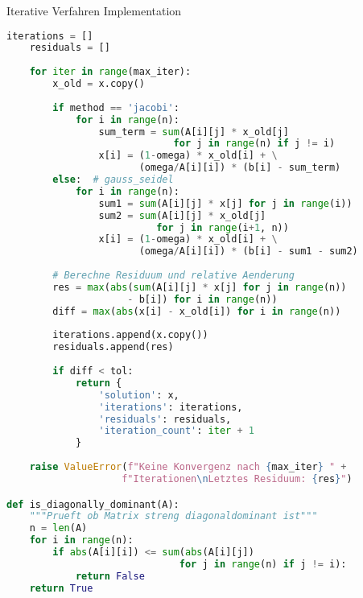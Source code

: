 \begin{examplecode}{Iterative Verfahren Implementation}
\begin{lstlisting}[language=Python, style=basesmol]
    iterations = []
    residuals = []
    
    for iter in range(max_iter):
        x_old = x.copy()
        
        if method == 'jacobi':
            for i in range(n):
                sum_term = sum(A[i][j] * x_old[j] 
                             for j in range(n) if j != i)
                x[i] = (1-omega) * x_old[i] + \
                       (omega/A[i][i]) * (b[i] - sum_term)
        else:  # gauss_seidel
            for i in range(n):
                sum1 = sum(A[i][j] * x[j] for j in range(i))
                sum2 = sum(A[i][j] * x_old[j] 
                          for j in range(i+1, n))
                x[i] = (1-omega) * x_old[i] + \
                       (omega/A[i][i]) * (b[i] - sum1 - sum2)
        
        # Berechne Residuum und relative Aenderung
        res = max(abs(sum(A[i][j] * x[j] for j in range(n)) 
                     - b[i]) for i in range(n))
        diff = max(abs(x[i] - x_old[i]) for i in range(n))
        
        iterations.append(x.copy())
        residuals.append(res)
        
        if diff < tol:
            return {
                'solution': x,
                'iterations': iterations,
                'residuals': residuals,
                'iteration_count': iter + 1
            }
            
    raise ValueError(f"Keine Konvergenz nach {max_iter} " + 
                    f"Iterationen\nLetztes Residuum: {res}")

def is_diagonally_dominant(A):
    """Prueft ob Matrix streng diagonaldominant ist"""
    n = len(A)
    for i in range(n):
        if abs(A[i][i]) <= sum(abs(A[i][j]) 
                              for j in range(n) if j != i):
            return False
    return True
\end{lstlisting}
\end{examplecode}

